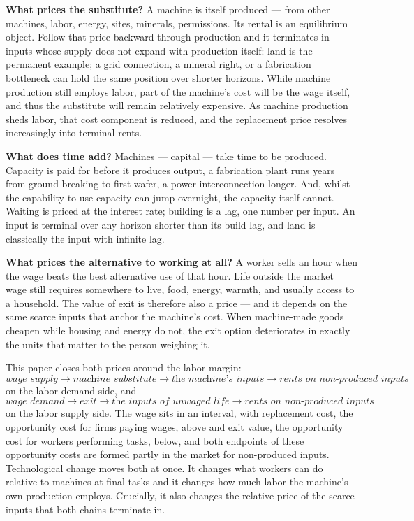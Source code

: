 \documentclass[12pt]{article}
\theoremstyle{plain}
\begin{document}
\textbf{What prices the substitute?} A machine is itself produced --- from other machines, labor, energy, sites, minerals, permissions. Its rental is an equilibrium object. Follow that price backward through production and it terminates in inputs whose supply does not expand with production itself: land is the permanent example; a grid connection, a mineral right, or a fabrication bottleneck can hold the same position over shorter horizons. While machine production still employs labor, part of the machine's cost will be the wage itself, and thus the substitute will remain relatively expensive. As machine production sheds labor, that cost component is reduced, and the replacement price resolves increasingly into terminal rents.

\textbf{What does time add?} Machines --- capital --- take time to be produced. Capacity is paid for before it produces output, a fabrication plant runs years from ground-breaking to first wafer, a power interconnection longer. And, whilst the capability to use capacity can jump overnight, the capacity itself cannot. Waiting is priced at the interest rate; building is a lag, one number per input. An input is terminal over any horizon shorter than its build lag, and land is classically the input with infinite lag.

\textbf{What prices the alternative to working at all?} A worker sells an hour when the wage beats the best alternative use of that hour. Life outside the market wage still requires somewhere to live, food, energy, warmth, and usually access to a household. The value of exit is therefore also a price --- and it depends on the same scarce inputs that anchor the machine's cost. When machine-made goods cheapen while housing and energy do not, the exit option deteriorates in exactly the units that matter to the person weighing it.

This paper closes both prices around the labor margin:
\[
\textit{wage supply} \to \textit{machine substitute} \to \textit{the machine's inputs} \to \textit{rents on non-produced inputs}
\]
on the labor demand side, and
\[
\textit{wage demand} \to \textit{exit} \to \textit{the inputs of unwaged life} \to \textit{rents on non-produced inputs}
\]
on the labor supply side. The wage sits in an interval, with replacement cost, the opportunity cost for firms paying wages, above and exit value, the opportunity cost for workers performing tasks, below, and both endpoints of these opportunity costs are formed partly in the market for non-produced inputs. Technological change moves both at once. It changes what workers can do relative to machines at final tasks and it changes how much labor the machine's own production employs. Crucially, it also changes the relative price of the scarce inputs that both chains terminate in.
\end{document}
